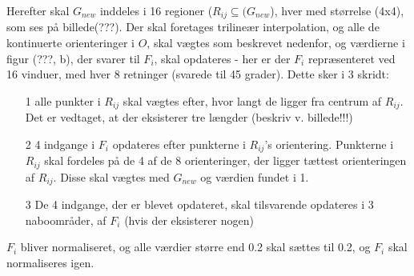 Herefter skal $G_{new}$ inddeles i 16 regioner ($R_{ij} \subseteq (G_{new}$), hver med størrelse (4x4), som ses på billede(???). Der skal foretages trilineær interpolation, og alle de kontinuerte orienteringer i $O$, skal vægtes som beskrevet nedenfor, og værdierne i figur (???, b), der svarer til $F_i$, skal opdateres - her er der $F_i$ repræsenteret ved 16 vinduer, med hver 8 retninger (svarede til 45 grader). Dette sker i 3 skridt:
\begin{itemize}
\item[1] alle punkter i $R_{ij}$ skal vægtes efter, hvor langt de ligger fra centrum af $R_{ij}$. Det er vedtaget, at der eksisterer tre længder (beskriv v. billede!!!)
\item[2] 4 indgange i $F_i$ opdateres efter punkterne i $R_{ij}$'s orientering. Punkterne i $R_{ij}$ skal fordeles på de 4 af de 8 orienteringer, der ligger tættest orienteringen af $R_{ij}$. Disse skal vægtes med $G_{new}$ og værdien fundet i 1. 
\item[3] De 4 indgange, der er blevet opdateret, skal tilsvarende opdateres i 3 naboområder, af $F_i$ (hvis der eksisterer nogen)
\end{itemize}

$F_i$ bliver normaliseret, og alle værdier større end 0.2 skal sættes til 0.2, og $F_i$ skal normaliseres igen.